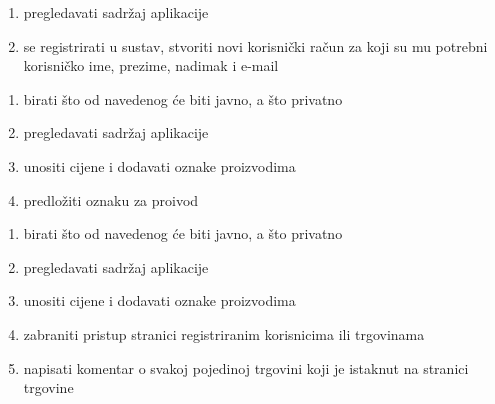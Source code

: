 			
			\begin{packed_enum}
				\item  {}
				
				\begin{enumerate}
					
					\item pregledavati sadržaj aplikacije
					\item se registrirati u sustav, stvoriti novi korisnički račun za koji su mu potrebni korisničko ime, prezime, nadimak i e-mail
			
					
				\end{enumerate}
			
				\item  {}
				
				\begin{enumerate}
					
					\item birati što od navedenog će biti javno, a što privatno
					\item pregledavati sadržaj aplikacije
        	        \item unositi cijene i dodavati oznake proizvodima
                        \item predložiti oznaku za proivod
                        
					
				\end{enumerate}

                \item  {}
				
				\begin{enumerate}
					
					\item birati što od navedenog će biti javno, a što privatno
					\item pregledavati sadržaj aplikacije
        	        \item unositi cijene i dodavati oznake proizvodima
                        \item zabraniti pristup stranici registriranim korisnicima ili trgovinama
                        \item napisati komentar o svakoj pojedinoj trgovini koji je istaknut na stranici trgovine
                        
					
				\end{enumerate}

                \item  {}
				

\end{packed_enum}
